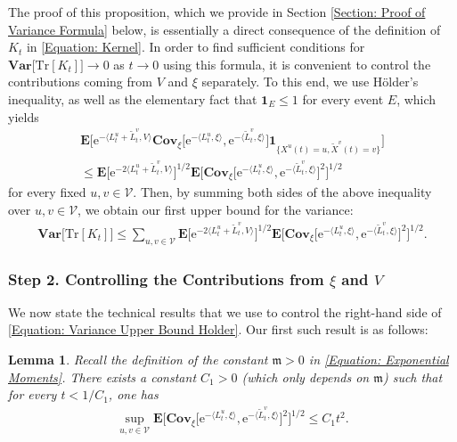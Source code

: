 \documentclass{amsart}
\numberwithin{equation}{section}
\newtheorem{lemma}[theorem]{Lemma}
\theoremstyle{definition}
\newcommand\mbf{\mathbf}
\newcommand\mf{\mathfrak}
\newcommand\mr{\mathrm}
\newcommand\ms{\mathscr}
\begin{document}
%

The proof of this proposition, which we provide in Section \ref{Section: Proof of Variance Formula} below,
is essentially a direct consequence of the definition of $K_t$ in \eqref{Equation: Kernel}.
In order to find sufficient conditions for $\mbf{Var}\big[\mr{Tr}[K_t]\big]\to0$ as $t\to0$ using this formula, it is
convenient to control the contributions coming from $V$ and $\xi$ separately. To this end,
we use H\"older's inequality, as well as the elementary fact that $\mbf 1_E\leq 1$ for every event $E$,
which yields
\begin{multline*}
\mbf E\Big[\mr e^{-\langle L^u_t+\tilde L^v_t,V\rangle}
\mbf{Cov}_\xi\big[\mr e^{-\langle L^u_t,\xi\rangle},\mr e^{-\langle\tilde L^v_t,\xi\rangle}\big]\mbf 1_{\{X^u(t)=u,\tilde X^v(t)=v\}}\Big]\\
\leq\mbf E\Big[\mr e^{-2\langle L^u_t+\tilde L^v_t,V\rangle}
\Big]^{1/2}\mbf E\Big[\mbf{Cov}_{\xi}\Big[\mr e^{-\langle L^u_t,\xi\rangle},\mr e^{-\langle\tilde L^v_t,\xi\rangle}\Big]^2\Big]^{1/2}
\end{multline*}
for every fixed $u,v\in\ms V$.
Then, by summing both sides of the above inequality over $u,v \in \ms V$,
we obtain our first upper bound for the variance:
\begin{align}
\label{Equation: Variance Upper Bound Holder}
\mbf{Var}\big[\mr{Tr}[K_t]\big]\leq
\sum_{u,v\in\ms V}\mbf E\Big[\mr e^{-2\langle L^u_t+\tilde L^v_t,V\rangle}
\Big]^{1/2}\mbf E\Big[\mbf{Cov}_{\xi}\Big[\mr e^{-\langle L^u_t,\xi\rangle},\mr e^{-\langle\tilde L^v_t,\xi\rangle}\Big]^2\Big]^{1/2}.
\end{align}

%

\subsubsection{Step 2. Controlling the Contributions from $\xi$ and $V$}

%

We now state the technical results that we use to control the right-hand side of \eqref{Equation: Variance Upper Bound Holder}.
Our first such result is as follows:

%

\begin{lemma}
\label{Lemma: Variance Upper Bound 1}
Recall the definition of the constant $\mf m>0$ in \eqref{Equation: Exponential Moments}.
There exists a constant $C_1>0$ (which only depends on $\mf m$) such that
for every $t<1/C_1$, one has
\begin{align*}
\sup_{u,v\in\ms V}\mbf E\Big[\mbf{Cov}_{\xi}\big[\mr e^{-\langle L^u_t,\xi\rangle},\mr e^{-\langle\tilde L^v_t,\xi\rangle}\big]^2\Big]^{1/2}\leq C_1t^2.
\end{align*}
\end{lemma}
\end{document}
